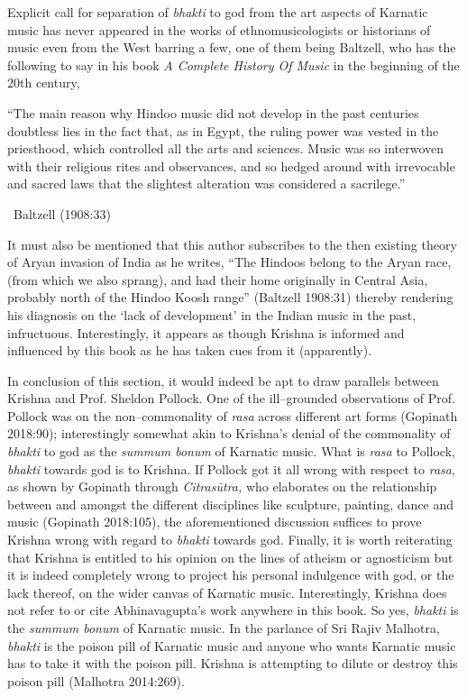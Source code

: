 Explicit call for separation of \textit{bhakti} to god from the art aspects of Karnatic music has never appeared in the works of ethnomusicologists or historians of music even from the West barring a few, one of them being Baltzell, who has the following to say in his book \textit{A Complete History Of Music} in the beginning of the 20th century,

\begin{myquote}
“The main reason why Hindoo music did not develop in the past centuries doubtless lies in the fact that, as in Egypt, the ruling power was vested in the priesthood, which controlled all the arts and sciences. Music was so interwoven with their religious rites and observances, and so hedged around with irrevocable and sacred laws that the slightest alteration was considered a sacrilege.” 

~\hfill Baltzell (1908:33)
\end{myquote}

It must also be mentioned that this author subscribes to the then existing theory of Aryan invasion of India as he writes, “The Hindoos belong to the Aryan race, (from which we also sprang), and had their home originally in Central Asia, probably north of the Hindoo Koosh range” (Baltzell 1908:31) thereby rendering his diagnosis on the ‘lack of development’ in the Indian music in the past, infructuous. Interestingly, it appears as though Krishna is informed and influenced by this book as he has taken cues from it (apparently).

In conclusion of this section, it would indeed be apt to draw parallels between Krishna and Prof. Sheldon Pollock. One of the ill–grounded observations of Prof. Pollock was on the non–commonality of \textit{rasa} across different art forms (Gopinath 2018:90); interestingly somewhat akin to Krishna’s denial of the commonality of \textit{bhakti} to god as the \textit{summum bonum} of Karnatic music. What is \textit{rasa} to Pollock, \textit{bhakti} towards god is to Krishna. If Pollock got it all wrong with respect to \textit{rasa}, as shown by Gopinath through \textit{Citrasūtra, }who elaborates on the relationship between and amongst the different disciplines like sculpture, painting, dance and music (Gopinath 2018:105), the aforementioned discussion suffices to prove Krishna wrong with regard to \textit{bhakti} towards god. Finally, it is worth reiterating that Krishna is entitled to his opinion on the lines of atheism or agnosticism but it is indeed completely wrong to project his personal indulgence with god, or the lack thereof, on the wider canvas of Karnatic music. Interestingly, Krishna does not refer to or cite Abhinavagupta’s work anywhere in this book. So yes, \textit{bhakti} is the \textit{summum bonum} of Karnatic music. In the parlance of Sri Rajiv Malhotra, \textit{bhakti} is the poison pill of Karnatic music and anyone who wants Karnatic music has to take it with the poison pill. Krishna is attempting to dilute or destroy this poison pill (Malhotra 2014:269).


